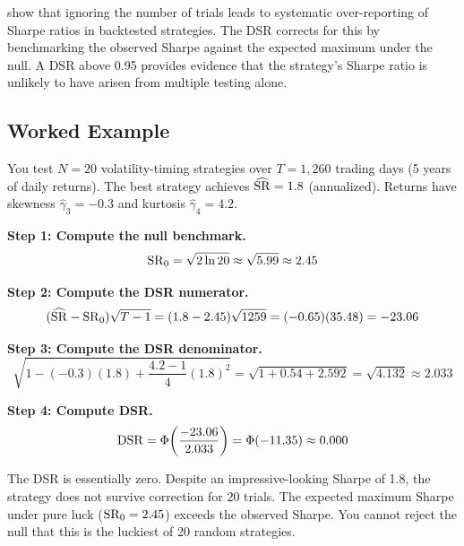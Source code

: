 \begin{keyresult}
\citet{Bailey2014DSR} show that ignoring the number of trials leads to systematic over-reporting of Sharpe ratios in backtested strategies.
The DSR corrects for this by benchmarking the observed Sharpe against the expected maximum under the null.
A DSR above 0.95 provides evidence that the strategy's Sharpe ratio is unlikely to have arisen from multiple testing alone.
\end{keyresult}

\subsection{Worked Example}

\begin{workedexample}
You test $N = 20$ volatility-timing strategies over $T = 1{,}260$ trading days (5 years of daily returns).
The best strategy achieves $\widehat{\operatorname{SR}} = 1.8$ (annualized).
Returns have skewness $\hat{\gamma}_3 = -0.3$ and kurtosis $\hat{\gamma}_4 = 4.2$.

\textbf{Step 1: Compute the null benchmark.}
\[
\operatorname{SR}_0 = \sqrt{2 \ln 20} \approx \sqrt{5.99} \approx 2.45
\]

\textbf{Step 2: Compute the DSR numerator.}
\[
(\widehat{\operatorname{SR}} - \operatorname{SR}_0)\sqrt{T - 1} = (1.8 - 2.45)\sqrt{1259} = (-0.65)(35.48) = -23.06
\]

\textbf{Step 3: Compute the DSR denominator.}
\[
\sqrt{1 - (-0.3)(1.8) + \frac{4.2 - 1}{4}(1.8)^2} = \sqrt{1 + 0.54 + 2.592} = \sqrt{4.132} \approx 2.033
\]

\textbf{Step 4: Compute DSR.}
\[
\operatorname{DSR} = \Phi\!\left(\frac{-23.06}{2.033}\right) = \Phi(-11.35) \approx 0.000
\]

The DSR is essentially zero.
Despite an impressive-looking Sharpe of 1.8, the strategy does not survive correction for 20 trials.
The expected maximum Sharpe under pure luck ($\operatorname{SR}_0 = 2.45$) exceeds the observed Sharpe.
You cannot reject the null that this is the luckiest of 20 random strategies.


\end{workedexample}
